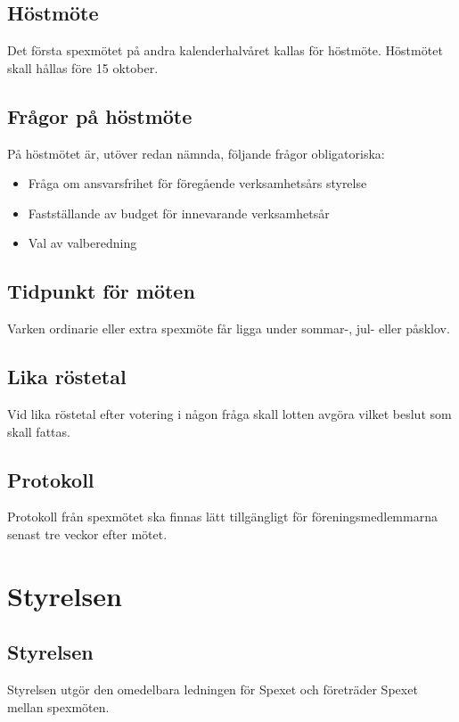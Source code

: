 \documentclass[a4paper]{article}
\begin{document}
\subsection{Höstmöte}
Det första spexmötet på andra kalenderhalvåret kallas för höstmöte. Höstmötet skall hållas före 15 oktober.

\subsection{Frågor på höstmöte}
På höstmötet är, utöver redan nämnda, följande frågor obligatoriska:

\begin{itemize}
  \item Fråga om ansvarsfrihet för föregående verksamhetsårs styrelse
  \item Fastställande av budget för innevarande verksamhetsår
  \item Val av valberedning
\end{itemize}

\subsection{Tidpunkt för möten}
Varken ordinarie eller extra spexmöte får ligga under sommar-, jul- eller påsklov.

\subsection{Lika röstetal}
Vid lika röstetal efter votering i någon fråga skall lotten avgöra vilket beslut som skall fattas.

\subsection{Protokoll}
Protokoll från spexmötet ska finnas lätt tillgängligt för föreningsmedlemmarna senast tre veckor efter mötet.

\section{Styrelsen}
\label{section:styrelsen}

\subsection{Styrelsen}
Styrelsen utgör den omedelbara ledningen för Spexet och företräder Spexet mellan spexmöten.
\end{document}
